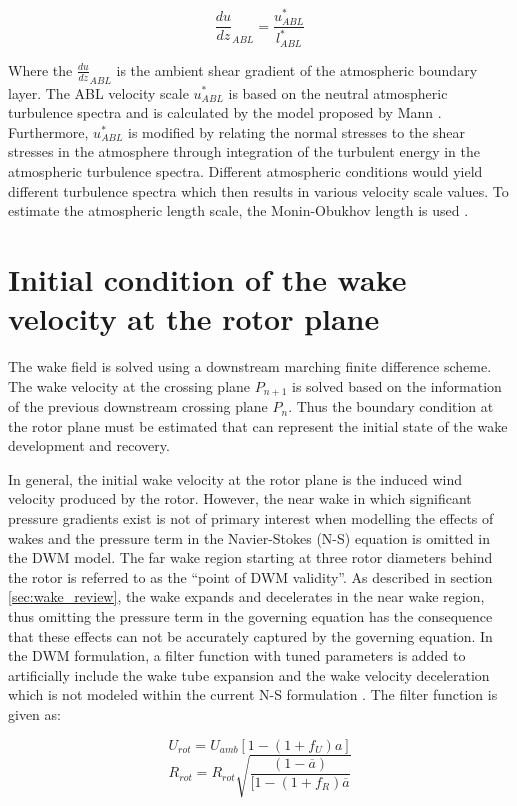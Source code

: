 \documentclass{umthesis}
\begin{document}
\begin{equation}
  \frac{du}{dz}_{ABL}=\frac{u^*_{ABL}}{l^*_{ABL}}
\end{equation}

Where the $\frac{du}{dz}_{ABL}$ is the ambient shear gradient of the atmospheric boundary layer. The ABL velocity scale $u^*_{ABL}$ is based on the neutral atmospheric turbulence spectra and is calculated by the model proposed by Mann \cite{Mann_spatial}\cite{Mann_Wind}. Furthermore, $u^*_{ABL}$ is modified by relating the normal stresses to the shear stresses in the atmosphere through integration of the turbulent energy in the atmospheric turbulence spectra. Different atmospheric conditions would yield different turbulence spectra which then results in various velocity scale values. To estimate the atmospheric length scale, the Monin-Obukhov length is used \cite{Keck_two}.


\section{Initial condition of the wake velocity at the rotor plane} \label{sec:wake_BC}
The wake field is solved using a downstream marching finite difference scheme. The wake velocity at the crossing plane $P_{n+1}$ is solved based on the information of the previous downstream crossing plane $P_n$. Thus the boundary condition at the rotor plane must be estimated that can represent the initial state of the wake development and recovery.

In general, the initial wake velocity at the rotor plane is the induced wind velocity produced by the rotor. However, the near wake in which significant pressure gradients exist is not of primary interest when modelling the effects of wakes and the pressure term in the Navier-Stokes (N-S) equation is omitted in the DWM model. The far wake region starting at three rotor diameters behind the rotor is referred to as the “point of DWM validity”. As described in section \ref{sec:wake_review}, the wake expands and decelerates in the near wake region, thus omitting the pressure term in the governing equation has the consequence that these effects can not be accurately captured by the governing equation. In the DWM formulation, a filter function with tuned parameters is added to artificially include the wake tube expansion and the wake velocity deceleration which is not modeled within the current N-S formulation \cite{hansen_impact_2012}. The filter function is given as:

\begin{equation}
  U_{rot}=U_{amb}[1-(1+f_U)a]
\end{equation}
\begin{equation}
  R_{rot}=R_{rot}\sqrt{\frac{(1-\overline{a})}{[1-(1+f_R)\overline{a}}}
\end{equation}
\end{document}
